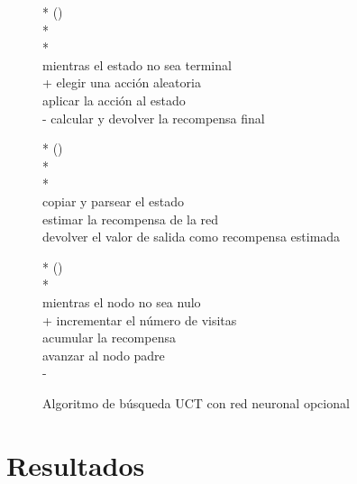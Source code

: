 \documentclass[conference,a4paper]{IEEEtran}
\begin{document}
\begin{figure}
  \begin{pseudo}*
    () \\*
     \\*
     \\
     \textnormal{mientras el} estado no  \textnormal{sea} terminal \\+
       \textnormal{elegir una acción} aleatoria \\
       aplicar  \textnormal{la acción al estado} \\-
     \textnormal{calcular y devolver la recompensa final}
  \end{pseudo}

  \begin{pseudo}*
    () \\*
     \\*
     \\
    \textnormal{copiar y parsear el estado} \\
    \textnormal{estimar la} recompensa \textnormal{de la red} \\
    \textnormal{devolver el valor de salida como recompensa estimada}
  \end{pseudo}

  \begin{pseudo}*
    () \\*
     \\
      \textnormal{mientras el} nodo no \textnormal{sea} nulo \\+
      incrementar\textnormal{ el número de }visitas \\
      acumular \textnormal{la }recompensa \\
      avanzar \textnormal{al nodo padre} \\-
  \end{pseudo}

  \caption{Algoritmo de búsqueda UCT con red neuronal opcional}
  \label{pcd:uct_pseudocodigo}
\end{figure}
\section{Resultados}
\end{document}
